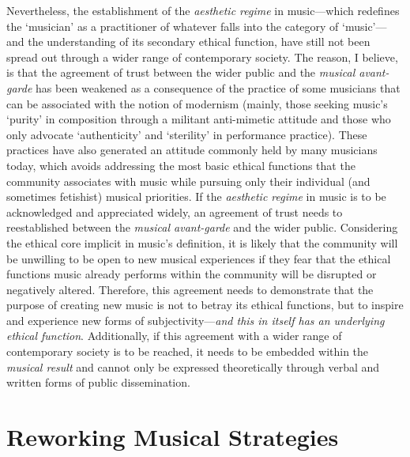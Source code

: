 Nevertheless, the establishment of the \emph{aesthetic regime} in music---which redefines the `musician' as a practitioner of whatever falls into the category of `music'---and the understanding of its secondary ethical function, have still not been spread out through a wider range of contemporary society. The reason, I believe, is that the agreement of trust between the wider public and the \emph{musical avant-garde} has been weakened as a consequence of the practice of some musicians that can be associated with the notion of modernism (mainly, those seeking music's `purity'  in composition through a militant anti-mimetic attitude and those who only advocate `authenticity' and `sterility' in performance practice). These practices have also generated an attitude commonly held by many musicians today, which avoids addressing the most basic ethical functions that the community associates with music while pursuing only their individual (and sometimes fetishist) musical priorities. If the \emph{aesthetic regime} in music is to be acknowledged and appreciated widely, an agreement of trust needs to reestablished between the \emph{musical avant-garde} and the wider public. Considering the ethical core implicit in music's definition, it is likely that the community will be unwilling to be open to new musical experiences if they fear that the ethical functions music already performs within the community will be disrupted or negatively altered. Therefore, this agreement needs to demonstrate that the purpose of creating new music is not to betray its ethical functions, but to inspire and experience new forms of subjectivity---\emph{and this in itself has an underlying ethical function}. Additionally, if this agreement with a wider range of contemporary society is to be reached, it needs to be embedded within the \emph{musical result} and cannot only be expressed theoretically through verbal and written forms of public dissemination.

\section{Reworking Musical Strategies}
%

